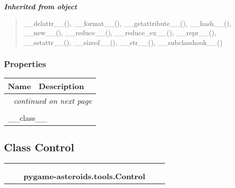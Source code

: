 \large{\textbf{\textit{Inherited from object}}}

\begin{quote}
\_\_delattr\_\_(), \_\_format\_\_(), \_\_getattribute\_\_(), \_\_hash\_\_(), \_\_new\_\_(), \_\_reduce\_\_(), \_\_reduce\_ex\_\_(), \_\_repr\_\_(), \_\_setattr\_\_(), \_\_sizeof\_\_(), \_\_str\_\_(), \_\_subclasshook\_\_()
\end{quote}


  \subsubsection{Properties}

    \vspace{-1cm}
\hspace{\varindent}\begin{longtable}{|p{\varnamewidth}|p{\vardescrwidth}|l}
\cline{1-2}
\cline{1-2} \centering \textbf{Name} & \centering \textbf{Description}& \\
\cline{1-2}
\endhead\cline{1-2}\multicolumn{3}{r}{\small\textit{continued on next page}}\\\endfoot\cline{1-2}
\endlastfoot\multicolumn{2}{|l|}{\textit{Inherited from object}}\\
\multicolumn{2}{|p{\varwidth}|}{\raggedright \_\_class\_\_}\\
\cline{1-2}
\end{longtable}



\subsection{Class Control}

    \label{pygame-asteroids:tools:Control}
\begin{tabular}{cccccc}
\multicolumn{2}{r}{\settowidth{\BCL}{object}\multirow{2}{\BCL}{object}}
&&
  \\\cline{3-3}
  &&\multicolumn{1}{c|}{}
&&
  \\
&&\multicolumn{2}{l}{\textbf{pygame-asteroids.tools.Control}}
\end{tabular}


